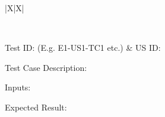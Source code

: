 

{
\setModernTableStyle %
\begin{xltabular}{\textwidth}{|X|X|}

    \hiderowcolors
    \caption{Test Case 1} \label{tab:test_case_ch2_1} \\
    \hline
    \showrowcolors

    Test ID: (E.g. E1-US1-TC1 etc.) & US ID: \\ \hline

    {Test Case Description: } \\ \hline

    {Inputs:} \\ \hline

    {Expected Result:} \\ \hline

\end{xltabular}
}
